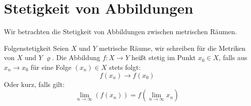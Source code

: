 \chapter{Stetigkeit von Abbildungen}
Wir betrachten die Stetigkeit von Abbildungen zwischen metrischen Räumen.
\begin{definition}{Folgenstetigkeit}
	Seien $X$ und $Y$ metrische Räume, wir schreiben für die Metriken von $X$ und $Y$ $\varrho$.
	Die Abbildung $f:X\rightarrow Y$ heißt stetig im Punkt $x_0\in X$, falls aus $x_n\rightarrow x_0$ für eine Folge $(x_n)\in X$ stets folgt:
	\begin{equation*}
		f(x_n)\rightarrow f(x_0)
	\end{equation*}
	Oder kurz, falls gilt:
	\begin{equation*}
		\lim\limits_{n\to\infty}(f(x_n))=f\left(\lim\limits_{n\to\infty}x_n\right)
	\end{equation*}
\end{definition}

